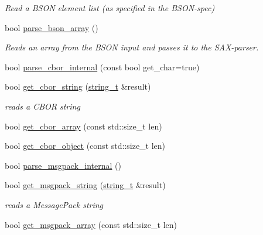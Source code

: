\begin{DoxyCompactItemize}
\begin{DoxyCompactList}\small\item\em Read a B\+S\+ON element list (as specified in the B\+S\+O\+N-\/spec) \end{DoxyCompactList}\item 
bool \hyperlink{classnlohmann_1_1detail_1_1binary__reader_a650dd6f9f05e86eb62cd4717301a5ffa}{parse\+\_\+bson\+\_\+array} ()
\begin{DoxyCompactList}\small\item\em Reads an array from the B\+S\+ON input and passes it to the S\+A\+X-\/parser. \end{DoxyCompactList}\item 
bool \hyperlink{classnlohmann_1_1detail_1_1binary__reader_a2fc47768d484a22fcd04e20106da1399}{parse\+\_\+cbor\+\_\+internal} (const bool get\+\_\+char=true)
\item 
bool \hyperlink{classnlohmann_1_1detail_1_1binary__reader_acca76844160000e1d8215cb5c7afbba1}{get\+\_\+cbor\+\_\+string} (\hyperlink{classnlohmann_1_1detail_1_1binary__reader_aa0b9729917ca7ee6ed01e3792341316e}{string\+\_\+t} \&result)
\begin{DoxyCompactList}\small\item\em reads a C\+B\+OR string \end{DoxyCompactList}\item 
bool \hyperlink{classnlohmann_1_1detail_1_1binary__reader_ac3dc99d36754aa0beac506b30604a8ed}{get\+\_\+cbor\+\_\+array} (const std\+::size\+\_\+t len)
\item 
bool \hyperlink{classnlohmann_1_1detail_1_1binary__reader_a2fcc776cd2c7bb52bbc511e97d36978a}{get\+\_\+cbor\+\_\+object} (const std\+::size\+\_\+t len)
\item 
bool \hyperlink{classnlohmann_1_1detail_1_1binary__reader_a81611d8a5faec1348d31f7e98fcd05ef}{parse\+\_\+msgpack\+\_\+internal} ()
\item 
bool \hyperlink{classnlohmann_1_1detail_1_1binary__reader_a5526ed98ca4c436cbae6f8a77ea207b8}{get\+\_\+msgpack\+\_\+string} (\hyperlink{classnlohmann_1_1detail_1_1binary__reader_aa0b9729917ca7ee6ed01e3792341316e}{string\+\_\+t} \&result)
\begin{DoxyCompactList}\small\item\em reads a Message\+Pack string \end{DoxyCompactList}\item 
bool \hyperlink{classnlohmann_1_1detail_1_1binary__reader_a09d3eed7523da6f61e7ffa98823aae2b}{get\+\_\+msgpack\+\_\+array} (const std\+::size\+\_\+t len)

\end{DoxyCompactItemize}
